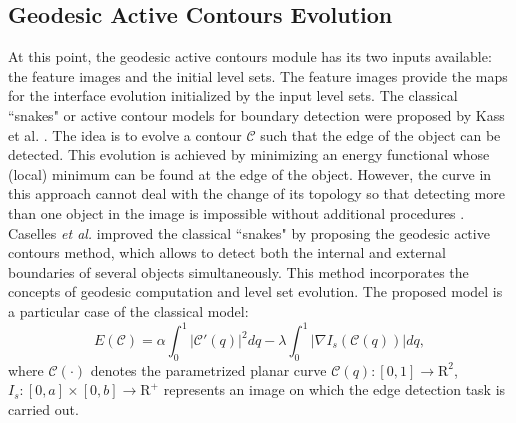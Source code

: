 \subsection{Geodesic Active Contours Evolution}

At this point, the geodesic active contours module has its two inputs available: the feature images and the initial level sets.
The feature images provide the maps for the interface evolution initialized by the input level sets.
The classical ``snakes" or active contour models for boundary detection were proposed by Kass et al. \cite{Kass1988}.
The idea is to evolve a contour $\mathcal{C}$ such that the edge of the object can be detected.
This evolution is achieved by minimizing an energy functional whose (local) minimum can be found at the edge of the object.
\setlength{\arraycolsep}{5pt}
However, the curve in this approach cannot deal with the change of its topology so that detecting more than one object in the image is impossible without additional procedures \cite{Caselles1997}.
Caselles \textit{et al.} \cite{Caselles1997} improved the classical ``snakes" by proposing the geodesic active contours method, which allows to detect both the internal and external boundaries of several objects simultaneously.
This method incorporates the concepts of geodesic computation and level set evolution.
The proposed model is a particular case of the classical model:
\begin{equation}
\label{eqn:ParticularSnakes}
E(\mathcal{C}) = \alpha \int_0^1 | \mathcal{C}'(q) |^2 dq - \lambda \int_0^1 | \nabla I_{s} ( \mathcal{C}(q) ) |dq,
\end{equation}
where $\mathcal{C}(\cdot)$ denotes the parametrized planar curve $\mathcal{C}(q):[0,1]\rightarrow \mathrm{R}^2$, $I_{s}:[0,a]\times [0,b]\rightarrow \mathrm{R}^{+}$ represents an image on which the edge detection task is carried out.

